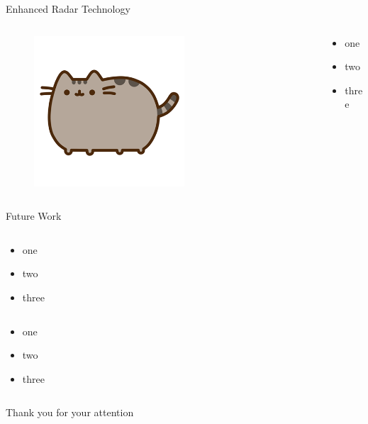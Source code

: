 \begin{frame}{Enhanced Radar Technology}
    \begin{columns}
        \begin{column}{0.5\textwidth}
            \begin{figure}
                \centering
                \includegraphics[width=0.6\textwidth]{images/pusheen.png}
            \end{figure}
        \end{column}
        \begin{column}{0.5\textwidth}
            \begin{itemize}
                \item one
                \item two
                \item three
            \end{itemize}
        \end{column}
    \end{columns}
\end{frame}

\begin{columnframe}{Future Work}
    \begin{column}{0.48\textwidth}
        \begin{itemize}
            \item one
            \item two
            \item three
        \end{itemize}
    \end{column}
    \begin{column}{0.48\textwidth}
        \begin{itemize}
            \item one
            \item two
            \item three
        \end{itemize}
    \end{column}
\end{columnframe}

\begin{frame}{}
    \centering
    \Large{Thank you for your attention}
\end{frame}

